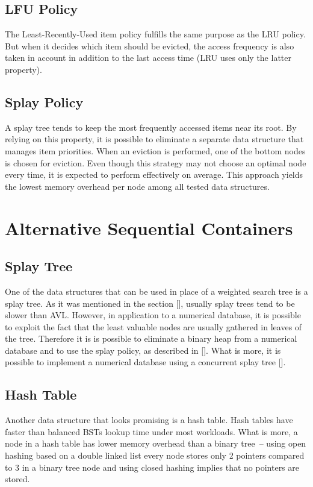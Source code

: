 \subsection{LFU Policy}
The Least-Recently-Used item policy fulfills the same purpose as the LRU policy. But when it decides which item should be evicted, the access frequency is also taken in account in addition to the last access time (LRU uses only the latter property).

\subsection{Splay Policy}
A splay tree tends to keep the most frequently accessed items near its root. By relying on this property, it is possible to eliminate a separate data structure that manages item priorities. When an eviction is performed, one of the bottom nodes is chosen for eviction. Even though this strategy may not choose an optimal node every time, it is expected to perform effectively on average. This approach yields the lowest memory overhead per node among all tested data structures.


\section{Alternative Sequential Containers}

\subsection{Splay Tree}
One of the data structures that can be used in place of a weighted search tree is a splay tree. As it was mentioned in the section [], usually splay trees tend to be slower than AVL. However, in application to a numerical database, it is possible to exploit the fact that the least valuable nodes are usually gathered in leaves of the tree. Therefore it is is possible to eliminate a binary heap from a numerical database and to use the splay policy, as described in []. What is more, it is possible to implement a numerical database using a concurrent splay tree [].

\subsection{Hash Table}
Another data structure that looks promising is a hash table. Hash tables have faster than balanced BSTs lookup time under most workloads. What is more, a node in a hash table has lower memory overhead than a binary tree~-- using open hashing based on a double linked list every node stores only 2 pointers compared to 3 in a binary tree node and using closed hashing implies that no pointers are stored.

